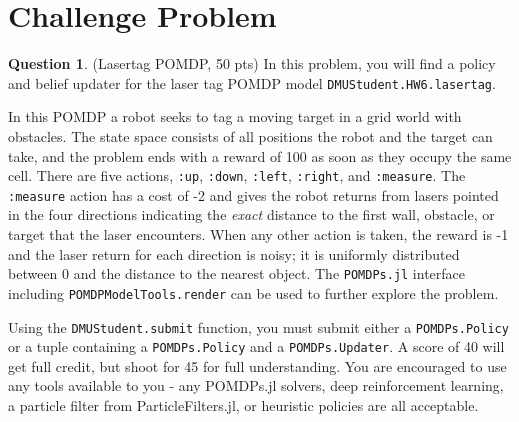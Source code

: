 \documentclass{article}
\theoremstyle{definition}
\newtheorem{question}[thm]{Question}
\begin{document}
\section{Challenge Problem}

\begin{question}
    (Lasertag POMDP, 50 pts) In this problem, you will find a policy and belief updater for the laser tag POMDP model \texttt{DMUStudent.HW6.lasertag}.

    In this POMDP a robot seeks to tag a moving target in a grid world with obstacles. The state space consists of all positions the robot and the target can take, and the problem ends with a reward of 100 as soon as they occupy the same cell. There are five actions, \texttt{:up}, \texttt{:down}, \texttt{:left}, \texttt{:right}, and \texttt{:measure}. The \texttt{:measure} action has a cost of -2 and gives the robot returns from lasers pointed in the four directions indicating the \emph{exact} distance to the first wall, obstacle, or target that the laser encounters. When any other action is taken, the reward is -1 and the laser return for each direction is noisy; it is uniformly distributed between 0 and the distance to the nearest object. The \texttt{POMDPs.jl} interface including \texttt{POMDPModelTools.render} can be used to further explore the problem.
    
    Using the \texttt{DMUStudent.submit} function, you must submit either a \texttt{POMDPs.Policy} or a tuple containing a \texttt{POMDPs.Policy} and a \texttt{POMDPs.Updater}. A score of 40 will get full credit, but shoot for 45 for full understanding. You are encouraged to use any tools available to you - any POMDPs.jl solvers, deep reinforcement learning, a particle filter from ParticleFilters.jl, or heuristic policies are all acceptable.
\end{question}
\end{document}
